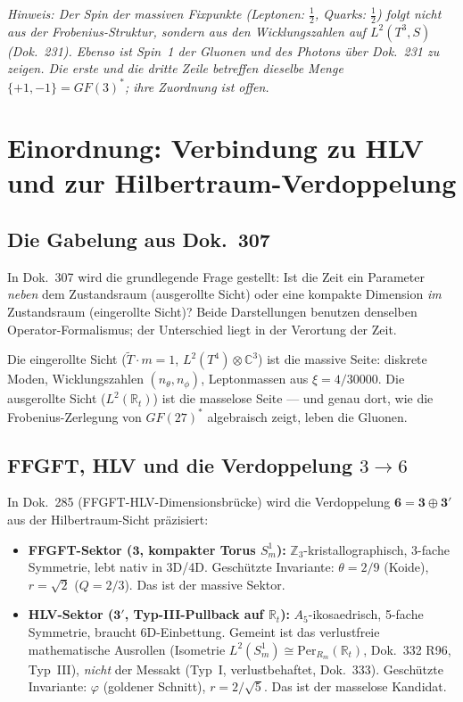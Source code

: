 \noindent\textit{Hinweis: Der Spin der massiven Fixpunkte (Leptonen: $\tfrac{1}{2}$,
Quarks: $\tfrac{1}{2}$) folgt nicht aus der Frobenius-Struktur, sondern aus
den Wicklungszahlen auf $L^2(T^3,S)$ (Dok.~231). Ebenso ist Spin~1 der
Gluonen und des Photons über Dok.~231 zu zeigen. Die erste und die dritte
Zeile betreffen dieselbe Menge $\{+1,-1\}=GF(3)^*$; ihre Zuordnung ist offen.}

\section{Einordnung: Verbindung zu HLV und zur Hilbertraum-Verdoppelung \KM}

\subsection{Die Gabelung aus Dok.~307}

In Dok.~307 wird die grundlegende Frage gestellt: Ist die Zeit ein Parameter
\emph{neben} dem Zustandsraum (ausgerollte Sicht) oder eine kompakte Dimension
\emph{im} Zustandsraum (eingerollte Sicht)? Beide Darstellungen benutzen
denselben Operator-Formalismus; der Unterschied liegt in der Verortung der Zeit.

Die eingerollte Sicht ($\tilde{T}\cdot m=1$, $L^2(T^4)\otimes\mathbb{C}^3$) ist
die massive Seite: diskrete Moden, Wicklungszahlen $(n_\theta, n_\phi)$,
Leptonmassen aus $\xi=4/30000$. Die ausgerollte Sicht ($L^2(\mathbb{R}_t)$) ist
die masselose Seite — und genau dort, wie die Frobenius-Zerlegung von $GF(27)^*$
algebraisch zeigt, leben die Gluonen.

\subsection{FFGFT, HLV und die Verdoppelung $3\to6$}

In Dok.~285 (FFGFT-HLV-Dimensionsbrücke) wird die Verdoppelung
$\mathbf{6}=\mathbf{3}\oplus\mathbf{3}'$ aus der Hilbertraum-Sicht präzisiert:

\begin{itemize}
\item \textbf{FFGFT-Sektor ($\mathbf{3}$, kompakter Torus $S^1_m$):}
  $\mathbb{Z}_3$-kristallographisch, 3-fache Symmetrie, lebt nativ in 3D/4D.
  Geschützte Invariante: $\theta=2/9$ (Koide), $r=\sqrt{2}$ ($Q=2/3$).
  Das ist der massive Sektor.
\item \textbf{HLV-Sektor ($\mathbf{3}'$, Typ-III-Pullback auf $\mathbb{R}_t$):}
  $A_5$-ikosaedrisch, 5-fache Symmetrie, braucht 6D-Einbettung. Gemeint ist
  das verlustfreie mathematische Ausrollen (Isometrie
  $L^2(S^1_m)\cong\mathrm{Per}_{R_m}(\mathbb{R}_t)$, Dok.~332 R96, Typ~III),
  \emph{nicht} der Messakt (Typ~I, verlustbehaftet, Dok.~333). Geschützte
  Invariante: $\varphi$ (goldener Schnitt), $r=2/\sqrt{5}$. Das ist der
  masselose Kandidat.
\end{itemize}

